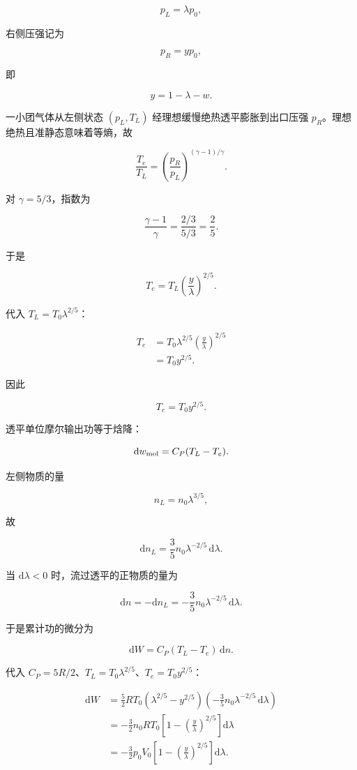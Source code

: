 \documentclass[12pt,a4paper,UTF8]{ctexart}
\begin{document}
\[p_L=\lambda p_0,\]

右侧压强记为

\[p_R=yp_0,\]

即

\[y=1-\lambda-w.\]

一小团气体从左侧状态 \((p_L,T_L)\) 经理想缓慢绝热透平膨胀到出口压强
\(p_R\)。理想绝热且准静态意味着等熵，故

\[
\frac{T_e}{T_L}
=\left(\frac{p_R}{p_L}\right)^{(\gamma-1)/\gamma}.
\]

对 \(\gamma=5/3\)，指数为

\[
\frac{\gamma-1}{\gamma}
=\frac{2/3}{5/3}
=\frac25.
\]

于是

\[
T_e=T_L\left(\frac y\lambda\right)^{2/5}.
\]

代入 \(T_L=T_0\lambda^{2/5}\)：

\[
\begin{aligned}
T_e
&=T_0\lambda^{2/5}
\left(\frac y\lambda\right)^{2/5}\\
&=T_0y^{2/5}.
\end{aligned}
\]

因此

\[\boxed{T_e=T_0y^{2/5}}.\]

透平单位摩尔输出功等于焓降：

\[\mathrm{d}w_{\rm mol}=C_P(T_L-T_e).\]

左侧物质的量

\[n_L=n_0\lambda^{3/5},\]

故

\[
\mathrm{d}n_L=\frac35n_0\lambda^{-2/5}\,\mathrm{d}\lambda.
\]

当 \(\mathrm{d}\lambda<0\) 时，流过透平的正物质的量为

\[
\mathrm{d}n=-\mathrm{d}n_L
=-\frac35n_0\lambda^{-2/5}\,\mathrm{d}\lambda.
\]

于是累计功的微分为

\[
\mathrm{d}W=C_P(T_L-T_e)\,\mathrm{d}n.
\]

代入 \(C_P=5R/2\)、\(T_L=T_0\lambda^{2/5}\)、\(T_e=T_0y^{2/5}\)：

\[
\begin{aligned}
\mathrm{d}W
&=\frac52R T_0
\left(\lambda^{2/5}-y^{2/5}\right)
\left(-\frac35n_0\lambda^{-2/5}\,\mathrm{d}\lambda\right)\\
&=-\frac32n_0RT_0
\left[1-\left(\frac y\lambda\right)^{2/5}\right]\mathrm{d}\lambda\\
&=-\frac32p_0V_0
\left[1-\left(\frac y\lambda\right)^{2/5}\right]\mathrm{d}\lambda.
\end{aligned}
\]
\end{document}
